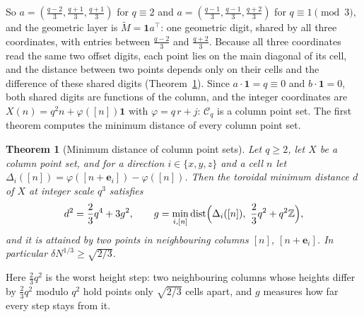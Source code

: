 \documentclass[11pt]{amsart}
\newtheorem{theorem}{Theorem}
\theoremstyle{definition}
\theoremstyle{plain}
\newcommand{\Z}{\mathbb{Z}}
\newcommand{\e}{\mathbf{e}}
\begin{document}
So $a=(\frac{q-2}3,\frac{q+1}3,\frac{q+1}3)$ for $q\equiv2$ and $a=(\frac{q-1}3,\frac{q-1}3,\frac{q+2}3)$ for $q\equiv1\pmod3$, and the geometric layer is $\tilde M=\mathbf 1a^{\!\top}$: one geometric digit, shared by all three coordinates, with entries between $\frac{q-2}3$ and $\frac{q+2}3$. Because all three coordinates read the same two offset digits, each point lies on the main diagonal of its cell, and the distance between two points depends only on their cells and the difference of these shared digits (Theorem~\ref{thm:colmin}). Since $a\cdot\mathbf 1=q\equiv0$ and $b\cdot\mathbf 1=0$, both shared digits are functions of the column, and the integer coordinates are $X(n)=q^2n+\varphi([n])\mathbf 1$ with $\varphi=q\,r+j$: $\mathcal C_q$ is a column point set. The first theorem computes the minimum distance of every column point set.

\begin{theorem}[Minimum distance of column point sets]\label{thm:colmin}
Let $q\ge2$, let $X$ be a column point set, and for a direction $i\in\{x,y,z\}$ and a cell $n$ let $\Delta_i([n])=\varphi([n+\e_i])-\varphi([n])$. Then the toroidal minimum distance $d$ of $X$ at integer scale $q^3$ satisfies
\[
d^2=\frac23q^4+3g^2,\qquad g=\min_{i,[n]}\operatorname{dist}\Bigl(\Delta_i([n]),\ \frac23q^2+q^2\Z\Bigr),
\]
and it is attained by two points in neighbouring columns $[n]$, $[n+\e_i]$. In particular $\delta N^{1/3}\ge\sqrt{2/3}$.
\end{theorem}

Here $\frac23q^2$ is the worst height step: two neighbouring columns whose heights differ by $\frac23q^2$ modulo $q^2$ hold points only $\sqrt{2/3}$ cells apart, and $g$ measures how far every step stays from it.
\end{document}
